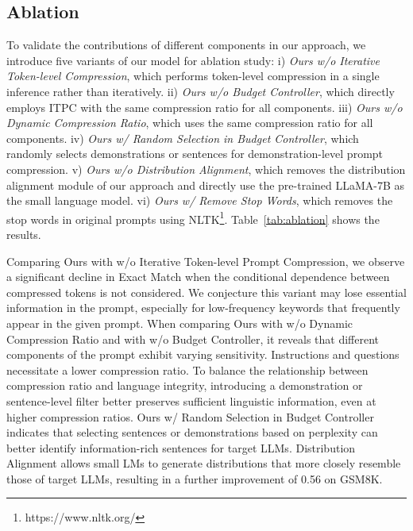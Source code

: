 
\subsection{Ablation}
To validate the contributions of different components in our approach, we introduce five variants of our model for ablation study:
i) \textit{Ours w/o Iterative Token-level Compression}, which performs token-level compression in a single inference rather than iteratively.
ii) \textit{Ours w/o Budget Controller}, which directly employs ITPC with the same compression ratio for all components.
iii) \textit{Ours w/o Dynamic Compression Ratio}, which uses the same compression ratio for all components.
iv) \textit{Ours w/ Random Selection in Budget Controller}, which randomly selects demonstrations or sentences for demonstration-level prompt compression.
v) \textit{Ours w/o Distribution Alignment}, which removes the distribution alignment module of our approach and directly use the pre-trained LLaMA-7B as the small language model.
vi) \textit{Ours w/ Remove Stop Words}, which removes the stop words in original prompts using NLTK\footnote{https://www.nltk.org/}.
Table~\ref{tab:ablation} shows the results.


Comparing Ours with w/o Iterative Token-level Prompt Compression, we observe a significant decline in Exact Match when the conditional dependence between compressed tokens is not considered.
We conjecture this variant may lose essential information in the prompt, especially for low-frequency keywords that frequently appear in the given prompt.
When comparing Ours with w/o Dynamic Compression Ratio and with w/o Budget Controller, it reveals that different components of the prompt exhibit varying sensitivity.
Instructions and questions necessitate a lower compression ratio.
To balance the relationship between compression ratio and language integrity, introducing a demonstration or sentence-level filter better preserves sufficient linguistic information, even at higher compression ratios. Ours w/ Random Selection in Budget Controller indicates that selecting sentences or demonstrations based on perplexity can better identify information-rich sentences for target LLMs.
Distribution Alignment allows small LMs to generate distributions that more closely resemble those of target LLMs, resulting in a further improvement of 0.56 on GSM8K.


